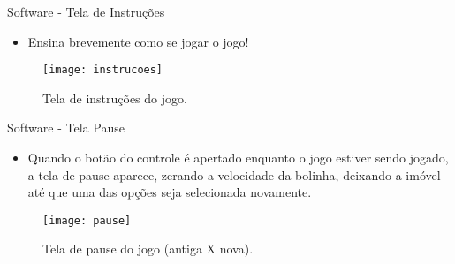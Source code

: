 \begin{frame}[c]{Software - Tela de Instruções}
	
	\begin{itemize}
		\item Ensina brevemente como se jogar o jogo!
	\end{itemize}
		
	  \begin{figure}
		\centering
	    	\texttt{[image: instrucoes]}
	    	\caption{Tela de instruções do jogo.}
	\end{figure}

\end{frame}
\begin{frame}[c]{Software - Tela Pause}
	
	\begin{itemize}
		\item Quando o botão do controle é apertado enquanto o jogo estiver sendo jogado, a tela de pause aparece, zerando a velocidade da bolinha, deixando-a imóvel até que uma das opções seja selecionada novamente.
	\end{itemize}
		
	  \begin{figure}
		\centering
	    	\texttt{[image: pause]}
	    	\caption{Tela de pause do jogo (antiga X nova).}
	\end{figure}

\end{frame}
